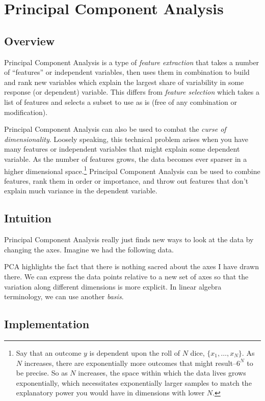 \documentclass[12pt]{article}
\begin{document}
\section{Principal Component Analysis}
\subsection{Overview}

Principal Component Analysis is a type of \emph{feature extraction}
that takes a number of ``features'' or independent variables, then
uses them in combination to build and rank new variables which
explain the largest share of variability in some response (or
dependent) variable. This differs from \emph{feature selection}
which takes a list of features and selects a subset to use as is
(free of any combination or modification).

Principal Component Analysis can also be used to combat the
\emph{curse of dimensionality}.  Loosely speaking, this technical
problem arises when you have many features or independent variables
that might explain some dependent variable. As the number of
features grows, the data becomes ever sparser in a higher
dimensional space.\footnote{Say that an outcome $y$ is dependent
upon the roll of $N$ dice, $\{x_1, \ldots, x_N\}$. As $N$ increases,
there are exponentially more outcomes that might
result--$6^N$ to be precise. So as $N$ increases, the space within
which the data lives grows exponentially, which necessitates
exponentially larger samples to match the explanatory power you
would have in dimensions with lower $N$.}
Principal Component Analysis can be used to combine features, rank
them in order or importance, and throw out features that don't
explain much variance in the dependent variable.


\subsection{Intuition}

Principal Component Analysis really just finds new ways
to look at the data by changing the axes.  Imagine we had
the following data.

PCA highlights the fact that there is nothing sacred
about the axes I have drawn there.  We can express the
data points relative to a new set of axes so that the
variation along different dimensions is more explicit. In
linear algebra terminology, we can use another \emph{basis}.

\subsection{Implementation}





\end{document}
